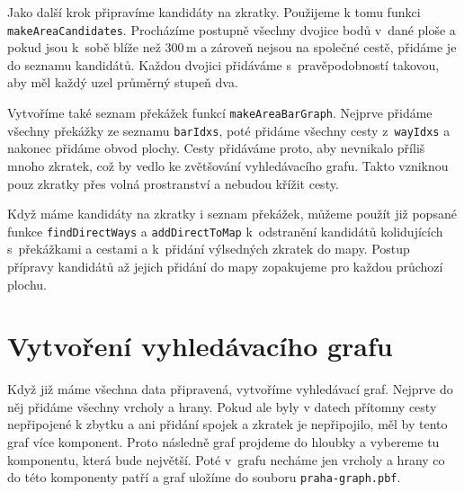 Jako další krok připravíme kandidáty na zkratky. Použijeme k tomu funkci
\verb|makeAreaCandidates|. Procházíme postupně všechny dvojice bodů v~dané ploše
a pokud jsou k~sobě blíže než 300\,m a zároveň nejsou na společné cestě, přidáme
je do seznamu kandidátů. Každou dvojici přidáváme s~pravěpodobností takovou, aby
měl každý uzel průměrný stupeň dva.

Vytvoříme také seznam překážek funkcí \verb|makeAreaBarGraph|. Nejprve přidáme
všechny překážky ze seznamu \verb|barIdxs|, poté přidáme všechny cesty
z~\verb|wayIdxs| a nakonec přidáme obvod plochy. Cesty přidáváme proto, aby
nevnikalo příliš mnoho zkratek, což by vedlo ke zvětšování vyhledávacího grafu.
Takto vzniknou pouz zkratky přes volná prostranství a nebudou křížit cesty.

Když máme kandidáty na zkratky i seznam překážek, můžeme použít již popsané funkce
\verb|findDirectWays| a \verb|addDirectToMap| k~odstranění kandidátů
kolidujících
s~překážkami a cestami a k~přidání výlsedných zkratek do mapy. Postup přípravy
kandidátů až jejich přidání do mapy zopakujeme pro každou průchozí plochu.


\section{Vytvoření vyhledávacího grafu}
Když již máme všechna data připravená, vytvoříme vyhledávací graf. Nejprve do
něj přidáme všechny vrcholy a hrany. Pokud ale byly v datech přítomny cesty
nepřipojené k zbytku a ani přidání spojek a zkratek je nepřipojilo, měl by tento
graf více komponent. Proto následně graf projdeme do hloubky a vybereme tu
komponentu, která bude největší. Poté v~grafu necháme jen vrcholy a hrany co do
této komponenty patří a graf uložíme do souboru \verb|praha-graph.pbf|. 
